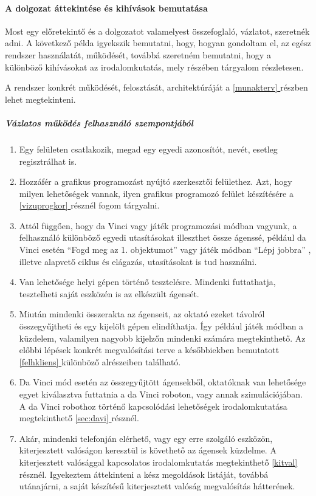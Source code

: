 \documentclass[12pt,a4paper,oneside]{report} %
\newcommand*{\fullref}[1]{\hyperref[{#1}]{\ref*{#1} \nameref*{#1}}} %
\begin{document}
\newpage
\paragraph{A dolgozat áttekintése és kihívások bemutatása}
Most egy előretekintő és a dolgozatot valamelyest összefoglaló, vázlatot, szeretnék adni. A következő példa igyekszik bemutatni, hogy, hogyan gondoltam el, az egész rendszer használatát, működését, továbbá szeretném bemutatni, hogy a különböző kihívásokat az irodalomkutatás, mely részében tárgyalom részletesen.
\par A rendszer konkrét működését, felosztását, architektúráját a \fullref{munakterv} részben lehet megtekinteni.

\subparagraph{Vázlatos működés felhasználó szempontjából}
\begin{enumerate}
	\item Egy felületen csatlakozik, megad egy egyedi azonosítót, nevét, esetleg regisztrálhat is.
	\item Hozzáfér a grafikus programozást nyújtó szerkesztői felülethez. Azt, hogy milyen lehetőségek vannak, ilyen grafikus programozó felület készítésére a \fullref{vizuprogkor} résznél fogom tárgyalni.
	\item Attól függően, hogy da Vinci vagy játék programozási módban vagyunk, a felhasználó különböző egyedi utasításokat illeszthet össze ágenssé, például da Vinci esetén ``Fogd meg az 1. objektumot'' vagy játék módban ``Lépj jobbra'' , illetve alapvető ciklus és elágazás, utasításokat is tud használni.
	\item Van lehetősége helyi gépen történő tesztelésre. Mindenki futtathatja, tesztelheti saját eszközén is az elkészült ágensét.
	\item Miután mindenki összerakta az ágenseit, az oktató ezeket távolról összegyűjtheti és egy kijelölt gépen elindíthatja. Így például játék módban a küzdelem, valamilyen nagyobb kijelzőn  mindenki számára  megtekinthető.  Az előbbi lépések konkrét megvalósítási terve a későbbiekben bemutatott \fullref{felhkliens} különböző alrészeiben található.
	\item Da Vinci mód esetén az összegyűjtött ágensekből, oktatóknak van lehetősége egyet kiválasztva futtatnia a da Vinci roboton, vagy annak szimulációjában. A da Vinci robothoz történő kapcsolódási lehetőségek irodalomkutatása megtekinthető \fullref{sec:davi} résznél.
	\item Akár, mindenki telefonján elérhető, vagy egy erre szolgáló  eszközön, kiterjesztett valóságon keresztül is követhető az ágensek  küzdelme. A kiterjesztett valósággal kapcsolatos irodalomkutatás megtekinthető \fullref{kitval} résznél. Igyekeztem áttekinteni a kész megoldások listáját, továbbá utánajárni, a saját készítésű kiterjesztett valóság megvalósítás hátterének.
\end{enumerate}
\end{document}
